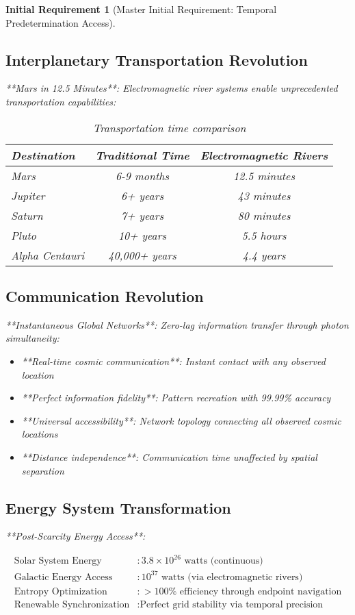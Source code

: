 \documentclass[12pt,a4paper]{article}
\newtheorem{requirement}[theorem]{Initial Requirement}
\theoremstyle{remark}
\begin{document}
\begin{requirement}[Master Initial Requirement: Temporal Predetermination Access]
\subsection{Interplanetary Transportation Revolution}

**Mars in 12.5 Minutes**: Electromagnetic river systems enable unprecedented transportation capabilities:

\begin{table}[H]
\centering
\begin{tabular}{lcc}
\toprule
Destination & Traditional Time & Electromagnetic Rivers \\
\midrule
Mars & 6-9 months & 12.5 minutes \\
Jupiter & 6+ years & 43 minutes \\
Saturn & 7+ years & 80 minutes \\
Pluto & 10+ years & 5.5 hours \\
Alpha Centauri & 40,000+ years & 4.4 years \\
\bottomrule
\end{tabular}
\caption{Transportation time comparison}
\end{table}

\subsection{Communication Revolution}

**Instantaneous Global Networks**: Zero-lag information transfer through photon simultaneity:

\begin{itemize}
\item **Real-time cosmic communication**: Instant contact with any observed location
\item **Perfect information fidelity**: Pattern recreation with 99.99\% accuracy
\item **Universal accessibility**: Network topology connecting all observed cosmic locations
\item **Distance independence**: Communication time unaffected by spatial separation
\end{itemize}

\subsection{Energy System Transformation}

**Post-Scarcity Energy Access**:

\begin{align}
\text{Solar System Energy} &: 3.8 \times 10^{26} \text{ watts (continuous)} \\
\text{Galactic Energy Access} &: 10^{37} \text{ watts (via electromagnetic rivers)} \\
\text{Entropy Optimization} &: >100\% \text{ efficiency through endpoint navigation} \\
\text{Renewable Synchronization} &: \text{Perfect grid stability via temporal precision}
\end{align}


\end{requirement}
\end{document}
